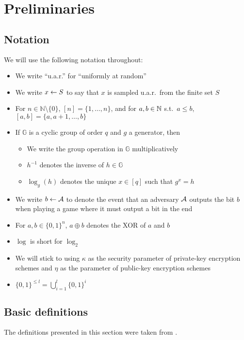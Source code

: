 \chapter{Preliminaries}

\section{Notation}

We will use the following notation throughout:
\begin{itemize}
	\item We write ``u.a.r.'' for ``uniformly at random''
	\item We write $x \leftarrow S$ to say that $x$ is sampled u.a.r.\ from the finite set $S$
	\item For $n \in \mathbb{N} \setminus \{0\}$, $[n] = \{1, \ldots, n\}$, and for $a, b \in \mathbb{N}$ s.t.\ $a \le b$, $[a, b] = \{a, a + 1, \ldots, b\}$
	\item If $\mathbb{G}$ is a cyclic group of order $q$ and $g$ a generator, then
	      \begin{itemize}
		      \item We write the group operation in $\mathbb{G}$ multiplicatively
		      \item $h^{-1}$ denotes the inverse of $h \in \mathbb{G}$
		      \item $\log_g(h)$ denotes the unique $x \in [q]$ such that $g^x = h$
	      \end{itemize}
	\item We write $b \leftarrow \mathcal{A}$ to denote the event that an adversary $\mathcal{A}$ outputs the bit $b$ when playing a game where it must output a bit in the end
	\item For $a, b \in \{0, 1\}^n$, $a \oplus b$ denotes the XOR of $a$ and $b$
	\item $\log$ is short for $\log_2$
	\item We will stick to using $\kappa$ as the security parameter of private-key encryption schemes and $\eta$ as the parameter of public-key encryption schemes
	\item $\{0, 1\}^{\le l} = \bigcup_{i = 1}^{l} \{0, 1\}^i $
\end{itemize}


\section{Basic definitions}

The definitions presented in this section were taken from \cite{introduction-to-modern-cryptography}.

